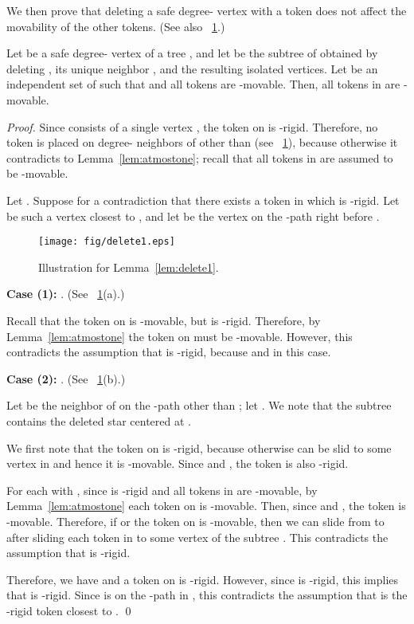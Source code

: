 \documentclass{llncs}
\newcounter{one}
\begin{document}
	We then prove that deleting a safe degree- vertex with a token does not affect the movability of the other tokens. 
(See also \figurename~\ref{fig:delete1}.) 
	\begin{lemma} \label{lem:delete1}
	Let  be a safe degree- vertex of a tree , and let  be the subtree of  obtained by deleting , its unique neighbor , and the resulting isolated vertices.
	Let  be an independent set of  such that  and all tokens are -movable.
	Then, all tokens in  are -movable.
	\end{lemma}
	\begin{proof}
	Since  consists of a single vertex , the token on  is -rigid. 
	Therefore, no token is placed on degree- neighbors of  other than  (see \figurename~\ref{fig:delete1}), because otherwise it contradicts to Lemma~\ref{lem:atmostone};
recall that all tokens in  are assumed to be -movable.


	Let . 
	Suppose for a contradiction that there exists a token in  which is -rigid.
	Let  be such a vertex closest to , and let  be the vertex on the -path right before .
\smallskip

\begin{figure}[b]
\begin{center}
	\texttt{[image: fig/delete1.eps]}
	\end{center}
	\vspace{-1em}
	\caption{Illustration for Lemma~\ref{lem:delete1}.}
	\label{fig:delete1}
\end{figure}


\noindent
	{\bf Case (1):} . (See \figurename~\ref{fig:delete1}(a).)

	Recall that the token on  is -movable, but is -rigid. 
	Therefore, by Lemma~\ref{lem:atmostone} the token on  must be -movable.
	However, this contradicts the assumption that  is -rigid, because  and  in this case. 
\medskip

\noindent
	{\bf Case (2):} . (See \figurename~\ref{fig:delete1}(b).)

	Let  be the neighbor of  on the -path other than ; 
let .
	We note that the subtree  contains the deleted star  centered at .

	We first note that the token  on  is -rigid, because otherwise  can be slid to some vertex in  and hence it is -movable. 
	Since  and , the token  is also -rigid. 
	
	For each  with , since  is -rigid and all tokens in  are -movable, by Lemma~\ref{lem:atmostone} each token  on  is -movable. 
	Then, since  and , the token  is -movable. 
	Therefore, if  or the token  on  is -movable, then we can slide  from  to  after sliding each token  in  to some vertex of the subtree .
	This contradicts the assumption that  is -rigid. 
	
	Therefore, we have  and a token  on  is -rigid. 
	However, since  is -rigid, this implies that  is -rigid. 
	Since  is on the -path in , this contradicts the assumption that  is the -rigid token closest to .  
\qed
\end{proof}
\end{document}

